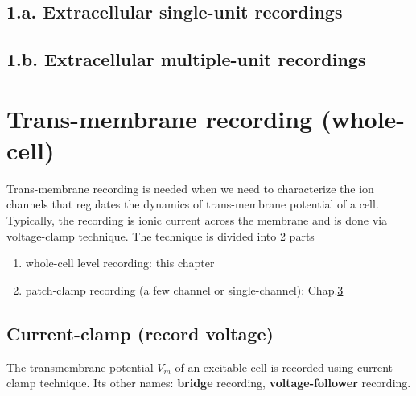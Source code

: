 \section{1.a. Extracellular single-unit recordings }
\label{sec:extracellular-recording-single-unit}

\section{1.b. Extracellular multiple-unit recordings }
\label{sec:extracellular-recording-multiple-unit}


\chapter{Trans-membrane recording (whole-cell)}
\label{chap:voltage-clamp-whole-cell}

Trans-membrane recording is needed when we need to characterize the ion channels
that regulates the dynamics of trans-membrane potential of a cell.
Typically, the recording is ionic current across the membrane and is done via
voltage-clamp technique. The technique is divided into 2 parts
\begin{enumerate}
  \item whole-cell level recording: this chapter

  \item patch-clamp recording (a few channel or single-channel):
  Chap.\ref{chap:voltage-clamp-whole-cell}
\end{enumerate}

\section{Current-clamp (record voltage)}
\label{sec:current-clamp-protocol}
\label{sec:transmembrane-potential-recording}
\label{sec:membrane-potential-recording}

The transmembrane potential $V_m$ of an excitable cell is recorded using
current-clamp technique.
Its other names: {\bf bridge} recording, {\bf voltage-follower} recording.

